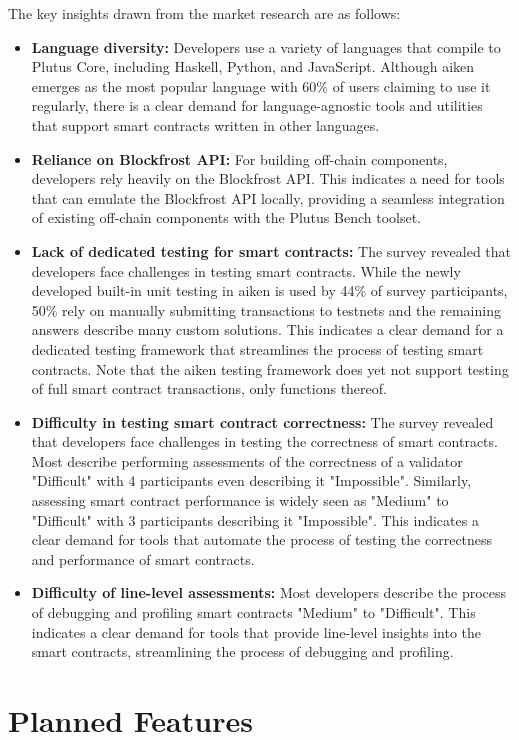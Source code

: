 \documentclass[11pt]{article}
\begin{document}
The key insights drawn from the market research are as follows:
\begin{itemize}
    \item \textbf{Language diversity:} Developers use a variety of languages that compile to Plutus Core, including Haskell, Python, and JavaScript. Although aiken emerges as the most popular language with 60\% of users claiming to use it regularly, there is a clear demand for language-agnostic tools and utilities that support smart contracts written in other languages.
    \item \textbf{Reliance on Blockfrost API:} For building off-chain components, developers rely heavily on the Blockfrost API. This indicates a need for tools that can emulate the Blockfrost API locally, providing a seamless integration of existing off-chain components with the Plutus Bench toolset.
    \item \textbf{Lack of dedicated testing for smart contracts:} The survey revealed that developers face challenges in testing smart contracts. While the newly developed built-in unit testing in aiken is used by 44\% of survey participants, 50\% rely on manually submitting transactions to testnets and the remaining answers describe many custom solutions. This indicates a clear demand for a dedicated testing framework that streamlines the process of testing smart contracts. Note that the aiken testing framework does yet not support testing of full smart contract transactions, only functions thereof.
    \item \textbf{Difficulty in testing smart contract correctness:} The survey revealed that developers face challenges in testing the correctness of smart contracts. Most describe performing assessments of the correctness of a validator "Difficult" with 4 participants even describing it "Impossible". Similarly, assessing smart contract performance is widely seen as "Medium" to "Difficult" with 3 participants describing it "Impossible". This indicates a clear demand for tools that automate the process of testing the correctness and performance of smart contracts.
    \item \textbf{Difficulty of line-level assessments:} Most developers describe the process of debugging and profiling smart contracts "Medium" to "Difficult". This indicates a clear demand for tools that provide line-level insights into the smart contracts, streamlining the process of debugging and profiling.
\end{itemize}

\section{Planned Features}
\end{document}
